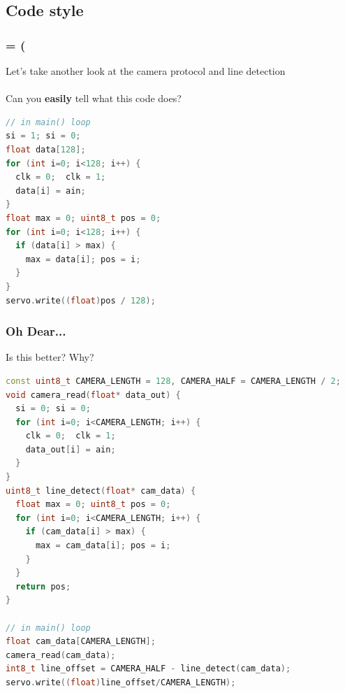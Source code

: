 \documentclass{beamer}
\begin{document}
\subsection{Code style}
\begin{frame}[fragile]
\frametitle{= (}
Let's take another look at the camera protocol and line detection \\
\hfill \\
Can you \textbf{easily} tell what this code does?
\begin{lstlisting}[language=C++,basicstyle=\ttfamily\scriptsize]
// in main() loop
si = 1; si = 0;
float data[128];
for (int i=0; i<128; i++) {
  clk = 0;  clk = 1;
  data[i] = ain;
}
float max = 0; uint8_t pos = 0;
for (int i=0; i<128; i++) {
  if (data[i] > max) {
    max = data[i]; pos = i;
  }
}
servo.write((float)pos / 128);
\end{lstlisting}
\vspace{2px}
\end{frame}


\begin{frame}[fragile]
\frametitle{Oh Dear...}
Is this better? Why?
\begin{lstlisting}[language=C++,basicstyle=\ttfamily\tiny]
const uint8_t CAMERA_LENGTH = 128, CAMERA_HALF = CAMERA_LENGTH / 2;
void camera_read(float* data_out) {
  si = 0; si = 0;
  for (int i=0; i<CAMERA_LENGTH; i++) {
    clk = 0;  clk = 1;
    data_out[i] = ain;
  }
}
uint8_t line_detect(float* cam_data) {
  float max = 0; uint8_t pos = 0;
  for (int i=0; i<CAMERA_LENGTH; i++) {
    if (cam_data[i] > max) {
      max = cam_data[i]; pos = i;
    }
  }
  return pos;
}

// in main() loop
float cam_data[CAMERA_LENGTH];
camera_read(cam_data);
int8_t line_offset = CAMERA_HALF - line_detect(cam_data);
servo.write((float)line_offset/CAMERA_LENGTH);
\end{lstlisting}
\end{frame}
\end{document}
